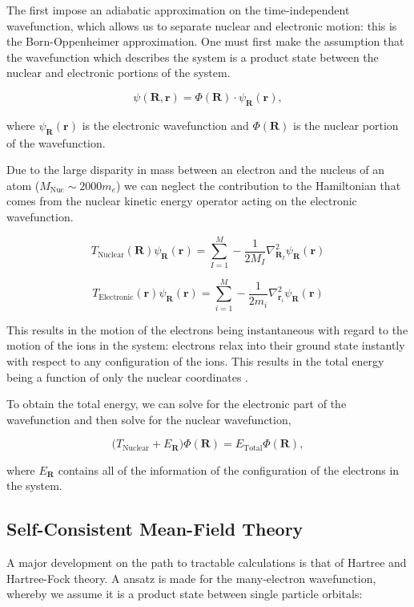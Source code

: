 \documentclass[a4paper,12pt,oneside,print,numbered,index,PageStyleIII]{PhDThesisPSnPDF}
\begin{document}
The first impose an adiabatic approximation on the time-independent wavefunction, which allows us to separate
nuclear and electronic motion: this is the Born-Oppenheimer approximation. One must first make the
assumption that the wavefunction which describes the system is a product state between the nuclear
and electronic portions of the system.

\[ \psi(\mathbf{R}, \mathbf{r}) = \Phi(\mathbf{R}) \cdot \psi_{\mathbf{R}}(\mathbf{r}), \]

where \(\psi_{\mathbf{R}}(\mathbf{r})\) is the electronic wavefunction and \(\Phi(\mathbf{R})\) is
the nuclear portion of the wavefunction.

Due to the large disparity in mass between an electron and the nucleus of an atom (\(M_\text{Nuc} \sim
 2000 m_e\)) we can neglect the contribution to the Hamiltonian that comes from the nuclear
kinetic energy operator acting on the electronic wavefunction.

\[T_{\text{Nuclear}}(\mathbf{R}) \psi_{\mathbf{R}}(\mathbf{r}) = \sum_{I =
 1}^{M} - \frac{1}{2M_{I}} \nabla^{2}_{\mathbf{R}_{I}} \psi_{\mathbf{R}}(\mathbf{r})\]


\[T_{\text{Electronic}}(\mathbf{r}) \psi_{\mathbf{R}}(\mathbf{r}) = \sum_{i =
 1}^{M} - \frac{1}{2m_{i}} \nabla^{2}_{\mathbf{r}_{i}}
 \psi_{\mathbf{R}}(\mathbf{r}) \]

This results in the motion of the electrons being instantaneous with regard to the
motion of the ions in the system: electrons relax into their ground state instantly with
respect to any configuration of the ions. This results in the total energy being a function of
only the nuclear coordinates \cite{Finnis1997}.

To obtain the total energy, we can solve for the electronic part of the wavefunction and then
solve for the nuclear wavefunction,

\[ \Big( T_{\text{Nuclear}} + E_{\mathbf{R}} \Big) \Phi(\mathbf{R}) = E_{\text{Total}} \Phi(\mathbf{R}),\]

where \(E_{\mathbf{R}}\) contains all of the information of the configuration of the electrons in
the system.


\subsection{Self-Consistent Mean-Field Theory}
\label{sec:orgbdcf766}

A major development on the path to tractable calculations is that of Hartree and Hartree-Fock
theory. A ansatz is made for the many-electron wavefunction, whereby we assume it is a product
state between single particle orbitals:
\end{document}
